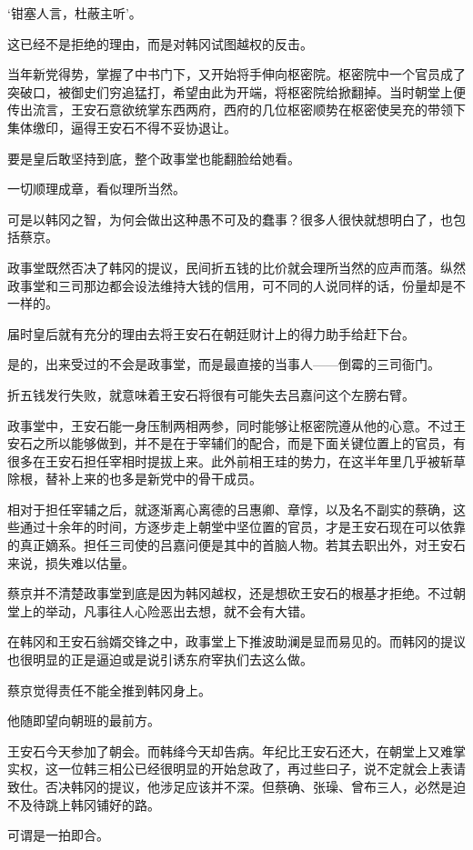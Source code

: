 ‘钳塞人言，杜蔽主听’。

这已经不是拒绝的理由，而是对韩冈试图越权的反击。

当年新党得势，掌握了中书门下，又开始将手伸向枢密院。枢密院中一个官员成了突破口，被御史们穷追猛打，希望由此为开端，将枢密院给掀翻掉。当时朝堂上便传出流言，王安石意欲统掌东西两府，西府的几位枢密顺势在枢密使吴充的带领下集体缴印，逼得王安石不得不妥协退让。

要是皇后敢坚持到底，整个政事堂也能翻脸给她看。

一切顺理成章，看似理所当然。

可是以韩冈之智，为何会做出这种愚不可及的蠢事？很多人很快就想明白了，也包括蔡京。

政事堂既然否决了韩冈的提议，民间折五钱的比价就会理所当然的应声而落。纵然政事堂和三司那边都会设法维持大钱的信用，可不同的人说同样的话，份量却是不一样的。

届时皇后就有充分的理由去将王安石在朝廷财计上的得力助手给赶下台。

是的，出来受过的不会是政事堂，而是最直接的当事人——倒霉的三司衙门。

折五钱发行失败，就意味着王安石将很有可能失去吕嘉问这个左膀右臂。

政事堂中，王安石能一身压制两相两参，同时能够让枢密院遵从他的心意。不过王安石之所以能够做到，并不是在于宰辅们的配合，而是下面关键位置上的官员，有很多在王安石担任宰相时提拔上来。此外前相王珪的势力，在这半年里几乎被斩草除根，替补上来的也多是新党中的骨干成员。

相对于担任宰辅之后，就逐渐离心离德的吕惠卿、章惇，以及名不副实的蔡确，这些通过十余年的时间，方逐步走上朝堂中坚位置的官员，才是王安石现在可以依靠的真正嫡系。担任三司使的吕嘉问便是其中的首脑人物。若其去职出外，对王安石来说，损失难以估量。

蔡京并不清楚政事堂到底是因为韩冈越权，还是想砍王安石的根基才拒绝。不过朝堂上的举动，凡事往人心险恶出去想，就不会有大错。

在韩冈和王安石翁婿交锋之中，政事堂上下推波助澜是显而易见的。而韩冈的提议也很明显的正是逼迫或是说引诱东府宰执们去这么做。

蔡京觉得责任不能全推到韩冈身上。

他随即望向朝班的最前方。

王安石今天参加了朝会。而韩绛今天却告病。年纪比王安石还大，在朝堂上又难掌实权，这一位韩三相公已经很明显的开始怠政了，再过些曰子，说不定就会上表请致仕。否决韩冈的提议，他涉足应该并不深。但蔡确、张璪、曾布三人，必然是迫不及待跳上韩冈铺好的路。

可谓是一拍即合。

